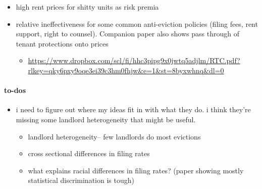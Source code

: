 \begin{itemize}
    \begin{itemize}
        \item high rent prices for shitty units as risk premia
        \item relative ineffectiveness for some common anti-eviction policies (filing fees, rent support, right to counsel). Companion paper also shows pass through of tenant protections onto prices
        \begin{itemize}
            \item \url{https://www.dropbox.com/scl/fi/hhc3pipg9x0jwtq5adjlm/RTC.pdf?rlkey=qky6pxy9oqe3ei39c3hm0fhjw&e=1&st=8byxwhnq&dl=0}
        \end{itemize}
    \end{itemize}
    
\end{itemize}

\paragraph{to-dos}
\begin{itemize}
    \item i need to figure out where my ideas fit in with what they do. i think they're missing some landlord heterogeneity that might be useful.
    \begin{itemize}
        \item landlord heterogeneity-- few landlords do most evictions
        \item cross sectional differences in filing rates
        \item what explains racial differences in filing rates? (paper showing mostly statistical discrimination is tough)
    \end{itemize}
\end{itemize}